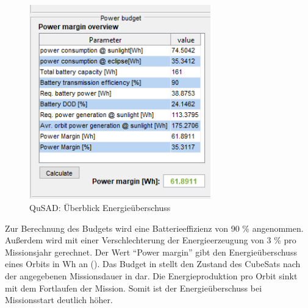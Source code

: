 			\begin{figure}[!h]
				\centering
					\includegraphics[width=0.70\textwidth]{graphics/power6.png}
				\caption{QuSAD: Überblick Energieüberschuss}
				\label{fig:power6}
			\end{figure}
Zur Berechnung des Budgets wird eine Batterieeffizienz von 90 \% angenommen. Außerdem wird mit einer Verschlechterung der Energieerzeugung von 3 \% pro Missionsjahr gerechnet. Der Wert “Power margin” gibt den Energieüberschuss eines Orbits in Wh an (). Das Budget in  stellt den Zustand des CubeSats nach der angegebenen Missionsdauer in  dar. Die Energieproduktion pro Orbit sinkt mit dem Fortlaufen der  Mission. Somit ist der Energieüberschuss bei Missionsstart deutlich höher. 			
			
			
